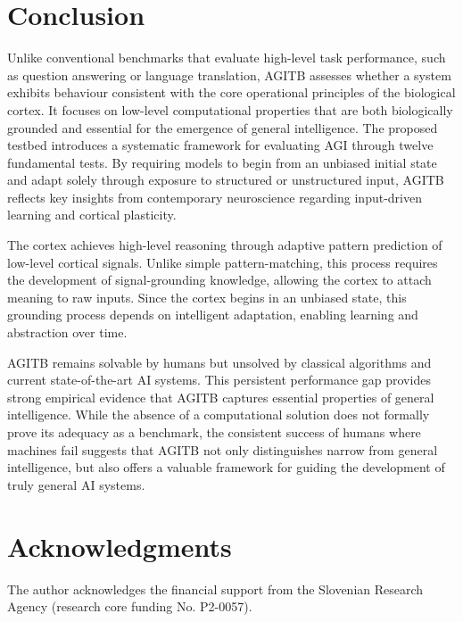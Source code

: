 \documentclass{article}
\begin{document}
\section{Conclusion}

Unlike conventional benchmarks that evaluate high-level task performance, such as question answering or language translation, AGITB assesses whether a system exhibits behaviour consistent with the core operational principles of the biological cortex. It focuses on low-level computational properties that are both biologically grounded and essential for the emergence of general intelligence. The proposed testbed introduces a systematic framework for evaluating AGI through twelve fundamental tests. By requiring models to begin from an unbiased initial state and adapt solely through exposure to structured or unstructured input, AGITB reflects key insights from contemporary neuroscience regarding input-driven learning and cortical plasticity.

The cortex achieves high-level reasoning through adaptive pattern prediction of low-level cortical signals. Unlike simple pattern-matching, this process requires the development of signal-grounding knowledge, allowing the cortex to attach meaning to raw inputs. Since the cortex begins in an unbiased state, this grounding process depends on intelligent adaptation, enabling learning and abstraction over time.

AGITB remains solvable by humans but unsolved by classical algorithms and current state-of-the-art AI systems. This persistent performance gap provides strong empirical evidence that AGITB captures essential properties of general intelligence. While the absence of a computational solution does not formally prove its adequacy as a benchmark, the consistent success of humans where machines fail suggests that AGITB not only distinguishes narrow from general intelligence, but also offers a valuable framework for guiding the development of truly general AI systems.

\section*{Acknowledgments}
The author acknowledges the financial support from the Slovenian Research Agency (research core funding No. P2-0057).
\end{document}
